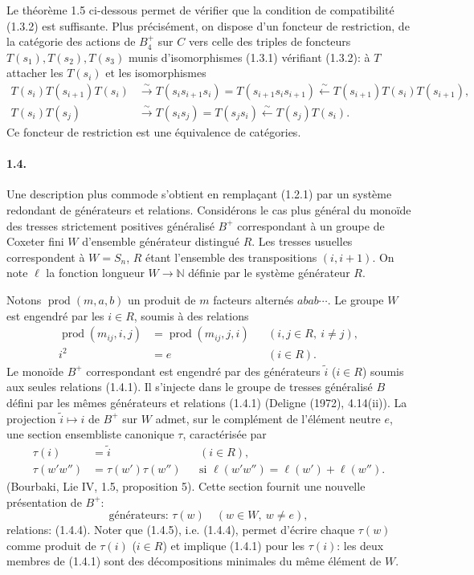 \documentclass[11pt]{article}
\newcommand{\prodword}{\operatorname{prod}}
\newcommand{\N}{\mathbb N}
\begin{document}
Le théorème 1.5 ci-dessous permet de vérifier que la condition de compatibilité (1.3.2) est suffisante. Plus précisément, on dispose d'un foncteur de restriction, de la catégorie des actions de $B_4^+$ sur $C$ vers celle des triples de foncteurs $T(s_1),T(s_2),T(s_3)$ munis d'isomorphismes (1.3.1) vérifiant (1.3.2): à $T$ attacher les $T(s_i)$ et les isomorphismes
\[
\begin{aligned}
 T(s_i)T(s_{i+1})T(s_i)&\xrightarrow{\sim}T(s_is_{i+1}s_i)=T(s_{i+1}s_is_{i+1})\xleftarrow{\sim}T(s_{i+1})T(s_i)T(s_{i+1}),\\
 T(s_i)T(s_j)&\xrightarrow{\sim}T(s_is_j)=T(s_js_i)\xleftarrow{\sim}T(s_j)T(s_i).
\end{aligned}
\]
Ce foncteur de restriction est une équivalence de catégories.

\paragraph{1.4.} Une description plus commode s'obtient en remplaçant (1.2.1) par un système redondant de générateurs et relations. Considérons le cas plus général du monoïde des tresses strictement positives généralisé $B^+$ correspondant à un groupe de Coxeter fini $W$ d'ensemble générateur distingué $R$. Les tresses usuelles correspondent à $W=S_n$, $R$ étant l'ensemble des transpositions $(i,i+1)$. On note $\ell$ la fonction longueur $W\to\N$ définie par le système générateur $R$.

Notons $\prodword(m,a,b)$ un produit de $m$ facteurs alternés $abab\cdots$. Le groupe $W$ est engendré par les $i\in R$, soumis à des relations
\begin{align}
 \prodword(m_{ij},i,j)&=\prodword(m_{ij},j,i) &&(i,j\in R,\ i\ne j),\tag{1.4.1}\\
 i^2&=e &&(i\in R).\tag{1.4.2}
\end{align}
Le monoïde $B^+$ correspondant est engendré par des générateurs $\widetilde{i}$ ($i\in R$) soumis aux seules relations (1.4.1). Il s'injecte dans le groupe de tresses généralisé $B$ défini par les mêmes générateurs et relations (1.4.1) (Deligne (1972), 4.14(ii)). La projection $\widetilde{i}\mapsto i$ de $B^+$ sur $W$ admet, sur le complément de l'élément neutre $e$, une section ensembliste canonique $\tau$, caractérisée par
\begin{align}
 \tau(i)&=\widetilde{i} &&(i\in R),\tag{1.4.3}\\
 \tau(w'w'')&=\tau(w')\tau(w'') &&\text{si }\ell(w'w'')=\ell(w')+\ell(w'').\tag{1.4.4}
\end{align}
(Bourbaki, Lie IV, 1.5, proposition 5). Cette section fournit une nouvelle présentation de $B^+$:
\begin{equation}
 \text{générateurs: }\tau(w)\quad(w\in W,\ w\ne e),\tag{1.4.5}
\end{equation}
relations: (1.4.4). Noter que (1.4.5), i.e. (1.4.4), permet d'écrire chaque $\tau(w)$ comme produit de $\tau(i)$ ($i\in R$) et implique (1.4.1) pour les $\tau(i)$: les deux membres de (1.4.1) sont des décompositions minimales du même élément de $W$.
\end{document}
